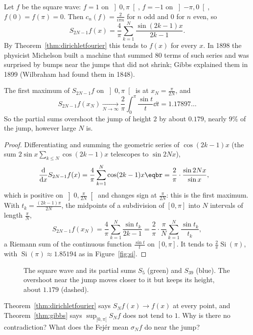 Let $f$ be the square wave: $f=1$ on $\left]0,\pi\right[$, $f=-1$ on $\left]-\pi,0\right[$, $f(0)=f(\pi)=0$. Then $c_n(f)=\frac2{i\pi n}$ for $n$ odd and $0$ for $n$ even, so
\[
S_{2N-1}f(x)=\frac4\pi\sum_{k=1}^N\frac{\sin(2k-1)x}{2k-1}.
\]
By Theorem~\ref{thm:dirichletfourier} this tends to $f(x)$ for every $x$. In 1898 the physicist Michelson built a machine that summed
$80$ terms of such series and was surprised by bumps near the jumps that did not shrink; Gibbs explained them in 1899
(Wilbraham had found them in 1848).

\begin{theorem}\label{thm:gibbs}
The first maximum of $S_{2N-1}f$ on $\left]0,\pi\right[$ is at $x_N=\frac\pi{2N}$, and
\[
S_{2N-1}f(x_N)\xrightarrow[N\to\infty]{}\frac2\pi\int_0^\pi\frac{\sin t}t\dd t=1.17897\ldots
\]
So the partial sums overshoot the jump of height $2$ by about $0.179$, nearly $9\%$ of the jump, however large $N$ is.
\end{theorem}
\begin{proof}
Differentiating and summing the geometric series of $\cos(2k-1)x$ (the sum $2\sin x\sum_{k\le N}\cos(2k-1)x$ telescopes to $\sin2Nx$),
\[
\begin{aligned}\frac{\mathrm d}{\mathrm dx}S_{2N-1}f(x)&=\frac4\pi\sum_{k=1}^N\cos(2k-1)x\eqbr=\frac2\pi\cdot\frac{\sin2Nx}{\sin x},\end{aligned}
\]
which is positive on $\left]0,\frac\pi{2N}\right[$ and changes sign at $\frac\pi{2N}$: this is the first maximum. With $t_k=\frac{(2k-1)\pi}{2N}$, the midpoints of a
subdivision of $[0,\pi]$ into $N$ intervals of length $\frac\pi N$,
\[
S_{2N-1}f(x_N)=\frac4\pi\sum_{k=1}^N\frac{\sin t_k}{2k-1}=\frac2\pi\cdot\frac\pi N\sum_{k=1}^N\frac{\sin t_k}{t_k},
\]
a Riemann sum of the continuous function $\frac{\sin t}t$ on $[0,\pi]$. It tends to $\frac2\pi\operatorname{Si}(\pi)$, with $\operatorname{Si}(\pi)\approx1.85194$ as in
Figure~\ref{fig:si}.
\end{proof}

\begin{figure}[ht]
\centering
{}
\caption{The square wave and its partial sums $S_5$ (green) and $S_{39}$ (blue). The overshoot near the jump moves closer to it but
keeps its height, about $1.179$ (dashed).}
\label{fig:gibbs}
\end{figure}

\begin{think}
Theorem~\ref{thm:dirichletfourier} says $S_Nf(x)\to f(x)$ at every point, and Theorem~\ref{thm:gibbs} says $\sup_{]0,\pi[}S_Nf$ does not tend to $1$. Why is there no
contradiction? What does the Fej\'er mean $\sigma_Nf$ do near the jump?
\end{think}

